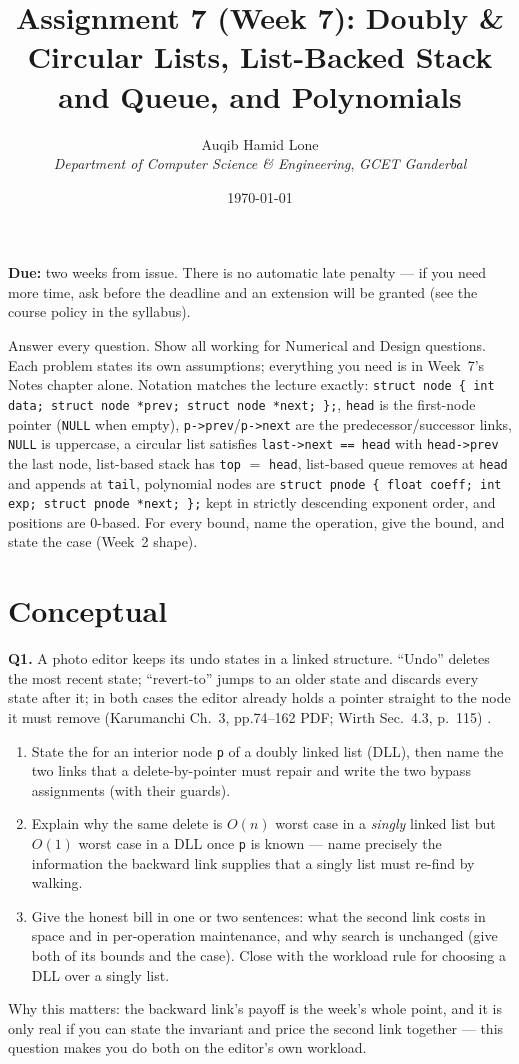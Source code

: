 \documentclass[11pt]{article}
\title{Assignment 7 (Week 7): Doubly \& Circular Lists, List-Backed Stack and Queue, and Polynomials}
\author{Auqib Hamid Lone\\[0.3em]
  \emph{Department of Computer Science \& Engineering}, \emph{GCET Ganderbal}}
\date{\today}
\begin{document}
\maketitle

\noindent\textbf{Due:} two weeks from issue. There is no automatic late penalty --- if you need more time, ask before the deadline and an extension will be granted (see the course policy in the syllabus).

\noindent Answer every question. Show all working for Numerical and Design questions. Each problem states its own assumptions; everything you need is in Week~7's Notes chapter alone. Notation matches the lecture exactly: \texttt{struct node \{ int data; struct node *prev; struct node *next; \};}, \texttt{head} is the first-node pointer (\texttt{NULL} when empty), \texttt{p->prev}/\texttt{p->next} are the predecessor/successor links, \texttt{NULL} is uppercase, a circular list satisfies \texttt{last->next == head} with \texttt{head->prev} the last node, list-based stack has \texttt{top} $=$ \texttt{head}, list-based queue removes at \texttt{head} and appends at \texttt{tail}, polynomial nodes are \texttt{struct pnode \{ float coeff; int exp; struct pnode *next; \};} kept in strictly descending exponent order, and positions are 0-based. For every bound, name the operation, give the bound, and state the case (Week~2 shape).

\section{Conceptual}

\textbf{Q1.} A photo editor keeps its undo states in a linked structure. ``Undo'' deletes the most recent state; ``revert-to'' jumps to an older state and discards every state after it; in both cases the editor already holds a pointer straight to the node it must remove (Karumanchi Ch.~3, pp.74--162 PDF; Wirth Sec.~4.3, p.~115) \cite{Karumanchi2017_data_structures_algorithms_made_easy,Wirth2004_algorithms_data_structures}.
\begin{enumerate}
  \item[(a)] State the  for an interior node \texttt{p} of a doubly linked list (DLL), then name the two links that a delete-by-pointer must repair and write the two bypass assignments (with their guards).
  \item[(b)] Explain why the same delete is $O(n)$ worst case in a \emph{singly} linked list but $O(1)$ worst case in a DLL once \texttt{p} is known --- name precisely the information the backward link supplies that a singly list must re-find by walking.
  \item[(c)] Give the honest bill in one or two sentences: what the second link costs in space and in per-operation maintenance, and why search is unchanged (give both of its bounds and the case). Close with the workload rule for choosing a DLL over a singly list.
\end{enumerate}
Why this matters: the backward link's payoff is the week's whole point, and it is only real if you can state the invariant and price the second link together --- this question makes you do both on the editor's own workload.
\end{document}

